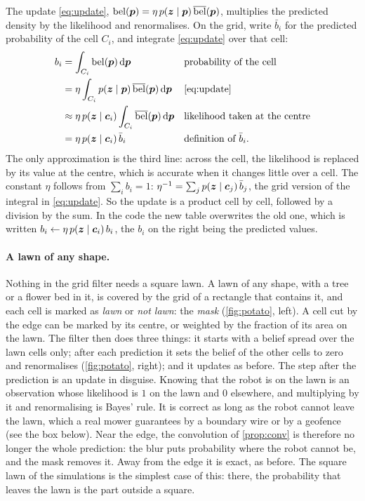 The update \eqref{eq:update},
$\operatorname{bel}(\bm{p})=\eta\,p(\bm{z}\mid\bm{p})\,\overline{\operatorname{bel}}(\bm{p})$, multiplies the predicted
density by the likelihood and renormalises. On the grid, write $\bar b_i$ for the
predicted probability of the cell $C_i$, and integrate
\eqref{eq:update} over that cell:
\begin{align*}
  b_i&=\int_{C_i}\operatorname{bel}(\bm{p})\,\mathrm d\bm{p}
  &&\text{probability of the cell}\\
  &=\eta\int_{C_i}p(\bm{z}\mid\bm{p})\,\overline{\operatorname{bel}}(\bm{p})\,\mathrm d\bm{p}
  &&\text{\eqref{eq:update}}\\
  &\approx\eta\,p(\bm{z}\mid\bm{c}_i)\int_{C_i}\overline{\operatorname{bel}}(\bm{p})\,\mathrm d\bm{p}
  &&\text{likelihood taken at the centre}\\
  &=\eta\,p(\bm{z}\mid\bm{c}_i)\,\bar b_i
  &&\text{definition of }\bar b_i .
\end{align*}
The only approximation is the third line: across the cell, the
likelihood is replaced by its value at the centre, which is accurate when
it changes little over a cell. The constant $\eta$ follows from
$\sum_ib_i=1$: $\eta^{-1}=\sum_jp(\bm{z}\mid\bm{c}_j)\,\bar b_j$, the grid
version of the integral in \eqref{eq:update}. So the update is a product
cell by cell, followed by a division by the sum. In the code the new
table overwrites the old one, which is written
$b_i\leftarrow\eta\,p(\bm{z}\mid\bm{c}_i)\,b_i$, the $b_i$ on the right being
the predicted values.

\paragraph{A lawn of any shape.} Nothing in the grid filter needs a
square lawn. A lawn of any shape, with a tree or a flower bed in it, is
covered by the grid of a rectangle that contains it, and each cell is
marked as \emph{lawn} or \emph{not lawn}: the \emph{mask}
(\cref{fig:potato}, left). A cell cut by the edge can be marked by its
centre, or weighted by the fraction of its area on the lawn. The filter
then does three things: it starts with a belief spread over the lawn
cells only; after each prediction it sets the belief of the other cells
to zero and renormalises (\cref{fig:potato}, right); and it updates as
before. The step after the prediction is an update in disguise. Knowing
that the robot is on the lawn is an observation whose likelihood is $1$
on the lawn and $0$ elsewhere, and multiplying by it and renormalising is
Bayes' rule. It is correct as long as the robot cannot leave the lawn,
which a real mower guarantees by a boundary wire or by a geofence (see
the box below). Near
the edge, the convolution of \cref{prop:conv} is therefore no longer the
whole prediction: the blur puts probability where the robot cannot be,
and the mask removes it. Away from the edge it is exact, as before. The
square lawn of the simulations is the simplest case of this: there, the
probability that leaves the lawn is the part outside a square.

